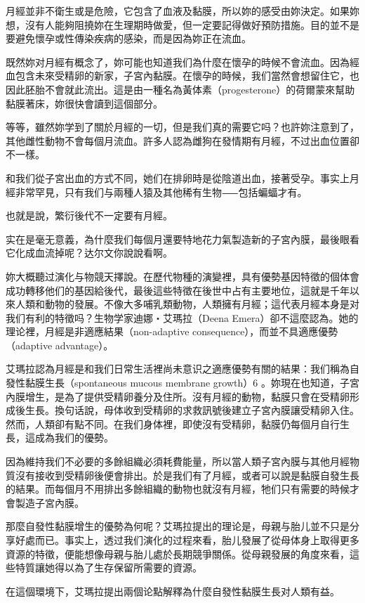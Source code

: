 \documentclass[12pt,UTF8]{ctexbook}
\begin{document}
月經並非不衛生或是危險，它包含了血液及黏膜，所以妳的感受由妳決定。如果妳想，沒有人能夠阻撓妳在生理期時做愛，但一定要記得做好預防措施。目的並不是要避免懷孕或性傳染疾病的感染，而是因為妳正在流血。

既然妳对月經有概念了，妳可能也知道我们為什麼在懷孕的時候不會流血。因為經血包含未來受精卵的新家，子宮內黏膜。在懷孕的時候，我们當然會想留住它，也因此胚胎不會就此流出。這是由一種名為黃体素（progesterone）的荷爾蒙來幫助黏膜著床，妳很快會讀到這個部分。

等等，雖然妳学到了關於月經的一切，但是我们真的需要它吗？也許妳注意到了，其他雌性動物不會每個月流血。許多人認為雌狗在發情期有月經，不过出血位置卻不一樣。

和我们從子宮出血的方式不同，她们在排卵時是從陰道出血，接著受孕。事实上月經非常罕見，只有我们与兩種人猿及其他稀有生物⸺包括蝙蝠才有。

也就是說，繁衍後代不一定要有月經。

实在是毫无意義，為什麼我们每個月還要特地花力氣製造新的子宮內膜，最後眼看它化成血流掉呢？达尔文你說說看啊。

妳大概聽过演化与物競天擇說。在歷代物種的演變裡，具有優勢基因特徵的個体會成功轉移他们的基因給後代，最後這些特徵在後世中占有主要地位，這就是千年以來人類和動物的發展。不像大多哺乳類動物，人類擁有月經；這代表月經本身是对我们有利的特徵吗？生物学家迪娜‧艾瑪拉（Deena Emera）卻不這麼認為。她的理论裡，月經是非適應結果（non-adaptive consequence），而並不具適應優勢（adaptive advantage）。

艾瑪拉認為月經是和我们日常生活裡尚未意识之適應優勢有關的結果：我们稱為自發性黏膜生長（spontaneous mucous membrane growth）6 。妳現在也知道，子宮內膜增生，是為了提供受精卵養分及住所。沒有月經的動物，黏膜只會在受精卵形成後生長。換句话說，母体收到受精卵的求救訊號後建立子宮內膜讓受精卵入住。然而，人類卻有點不同。在我们身体裡，即使沒有受精卵，黏膜仍每個月自行生長，這成為我们的優勢。

因為維持我们不必要的多餘組織必須耗費能量，所以當人類子宮內膜与其他月經物質沒有接收到受精卵後便會排出。於是我们有了月經，或者可以說是黏膜自發生長的結果。而每個月不用排出多餘組織的動物也就沒有月經，牠们只有需要的時候才會製造子宮內膜。

那麼自發性黏膜增生的優勢為何呢？艾瑪拉提出的理论是，母親与胎儿並不只是分享好處而已。事实上，透过我们演化的过程來看，胎儿發展了從母体身上取得更多資源的特徵，便能想像母親与胎儿處於長期競爭關係。從母親發展的角度來看，這些特質讓她得以為了生存保留所需要的資源。

在這個環境下，艾瑪拉提出兩個论點解釋為什麼自發性黏膜生長对人類有益。
\end{document}
